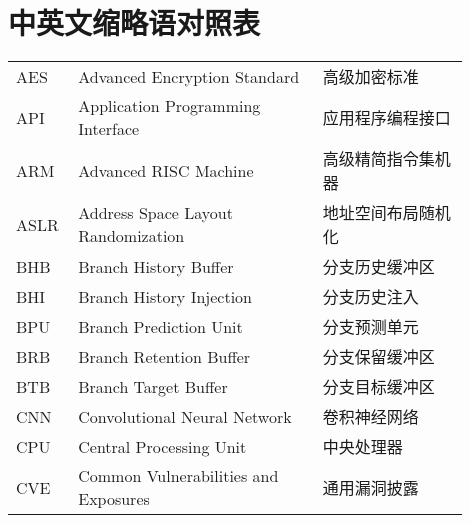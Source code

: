 %
%

\chapter{中英文缩略语对照表}

\begin{center}
\begin{spacing}{1.39}
\renewcommand\arraystretch{1}
\setlength{\tabcolsep}{4pt}
\begin{tabular}{p{0.1\linewidth}p{0.5\linewidth}p{0.3\linewidth}}
AES & Advanced Encryption Standard & 高级加密标准 \\
API & Application Programming Interface & 应用程序编程接口 \\
ARM & Advanced RISC Machine & 高级精简指令集机器 \\
ASLR & Address Space Layout Randomization & 地址空间布局随机化 \\

BHB & Branch History Buffer & 分支历史缓冲区 \\
BHI & Branch History Injection & 分支历史注入 \\
BPU & Branch Prediction Unit & 分支预测单元 \\
BRB & Branch Retention Buffer & 分支保留缓冲区 \\
BTB & Branch Target Buffer & 分支目标缓冲区 \\

CNN & Convolutional Neural Network & 卷积神经网络 \\
CPU & Central Processing Unit & 中央处理器 \\
CVE & Common Vulnerabilities and Exposures & 通用漏洞披露 \\
\end{tabular}
\end{spacing}
\end{center}
